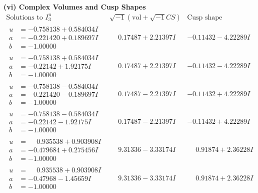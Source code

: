 \documentclass[1p]{elsarticle_modified}
\theoremstyle{definition}
\newcommand{\I}{\sqrt{-1}}
\begin{document}
\newpage\flushleft \textbf{(vi) Complex Volumes and Cusp Shapes}
$$\begin{array}{c|c|c}  
\text{Solutions to }I^u_{3}& \I (\text{vol} + \sqrt{-1}CS) & \text{Cusp shape}\\
 \hline 
\begin{aligned}
u &= -0.758138 + 0.584034 I \\
a &= -0.221420 + 0.189697 I \\
b &= -1.00000\phantom{ +0.000000I}\end{aligned}
 & \phantom{-}0.17487 + 2.21397 I & -0.11432 - 4.22289 I \\ \hline\begin{aligned}
u &= -0.758138 + 0.584034 I \\
a &= -0.22142 + 1.92175 I \\
b &= -1.00000\phantom{ +0.000000I}\end{aligned}
 & \phantom{-}0.17487 + 2.21397 I & -0.11432 - 4.22289 I \\ \hline\begin{aligned}
u &= -0.758138 - 0.584034 I \\
a &= -0.221420 - 0.189697 I \\
b &= -1.00000\phantom{ +0.000000I}\end{aligned}
 & \phantom{-}0.17487 - 2.21397 I & -0.11432 + 4.22289 I \\ \hline\begin{aligned}
u &= -0.758138 - 0.584034 I \\
a &= -0.22142 - 1.92175 I \\
b &= -1.00000\phantom{ +0.000000I}\end{aligned}
 & \phantom{-}0.17487 - 2.21397 I & -0.11432 + 4.22289 I \\ \hline\begin{aligned}
u &= \phantom{-}0.935538 + 0.903908 I \\
a &= -0.479684 + 0.275456 I \\
b &= -1.00000\phantom{ +0.000000I}\end{aligned}
 & \phantom{-}9.31336 - 3.33174 I & \phantom{-}0.91874 + 2.36228 I \\ \hline\begin{aligned}
u &= \phantom{-}0.935538 + 0.903908 I \\
a &= -0.47968 - 1.45659 I \\
b &= -1.00000\phantom{ +0.000000I}\end{aligned}
 & \phantom{-}9.31336 - 3.33174 I & \phantom{-}0.91874 + 2.36228 I \\ \hline\begin{aligned}

\end{aligned}
\end{array}$$
\end{document}

